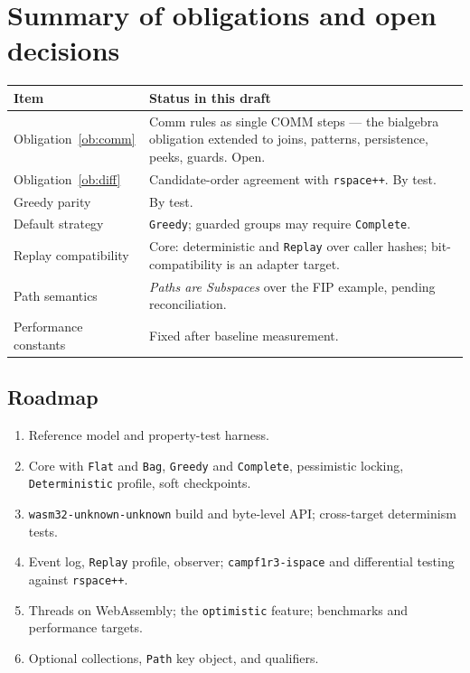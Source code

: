 \documentclass[11pt]{article}
\theoremstyle{plain}
\theoremstyle{definition}
\newcommand{\code}[1]{\texttt{#1}}
\begin{document}
\section{Summary of obligations and open decisions}\label{sec:open}

\begin{center}
\begin{tabularx}{\linewidth}{@{}lX@{}}
\toprule
Item & Status in this draft\\
\midrule
Obligation~\ref{ob:comm} & Comm rules as single COMM steps --- the bialgebra obligation extended to joins, patterns, persistence, peeks, guards. Open.\\
Obligation~\ref{ob:diff} & Candidate-order agreement with \code{rspace++}. By test.\\
Greedy parity & By test.\\
Default strategy & \code{Greedy}; guarded groups may require \code{Complete}.\\
Replay compatibility & Core: deterministic and \code{Replay} over caller hashes; bit-compatibility is an adapter target.\\
Path semantics & \emph{Paths are Subspaces} over the FIP example, pending reconciliation.\\
Performance constants & Fixed after baseline measurement.\\
\bottomrule
\end{tabularx}
\end{center}

\subsection*{Roadmap}
\begin{enumerate}[nosep]
\item Reference model and property-test harness.
\item Core with \code{Flat} and \code{Bag}, \code{Greedy} and \code{Complete},
      pessimistic locking, \code{Deterministic} profile, soft checkpoints.
\item \code{wasm32-unknown-unknown} build and byte-level API; cross-target
      determinism tests.
\item Event log, \code{Replay} profile, observer; \code{campf1r3-ispace} and
      differential testing against \code{rspace++}.
\item Threads on WebAssembly; the \code{optimistic} feature; benchmarks and
      performance targets.
\item Optional collections, \code{Path} key object, and qualifiers.
\end{enumerate}
\end{document}
